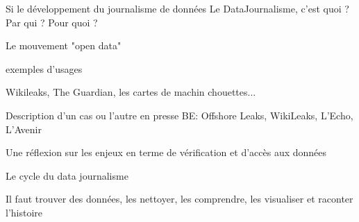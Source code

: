 Si le développement du journalisme de données
Le DataJournalisme, c'est quoi ? Par qui ? Pour quoi ?



Le mouvement "open data"

exemples d'usages

Wikileaks, The Guardian, les cartes de machin chouettes...


Description d'un cas ou l'autre en presse BE: Offshore Leaks, WikiLeaks, L'Echo, L'Avenir

Une réflexion sur les enjeux en terme de vérification et d'accès aux données


Le cycle du data journalisme

Il faut trouver des données, les nettoyer, les comprendre, les visualiser et 
raconter l'histoire
